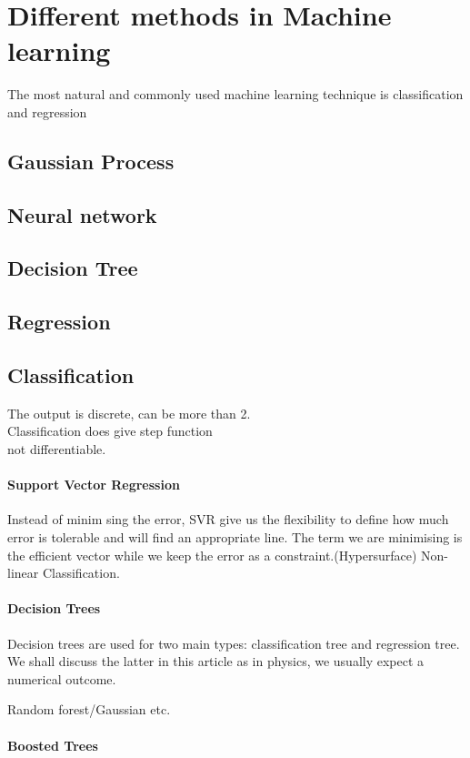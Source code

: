 \documentclass[12pt,a4paper]{article}
\begin{document}
\section{Different methods in Machine learning}
The most natural and commonly used machine learning technique is classification and regression
\subsection{Gaussian Process}
\subsection{Neural network}
\subsection{Decision Tree}
\subsection{Regression}
\subsection{Classification}
The output is discrete, can be more than 2.\\
Classification does give step function\\ not differentiable. 
\paragraph{Support Vector Regression}
Instead of minim sing the error, SVR give us the flexibility to define how much error is tolerable and will find an appropriate line. The term we are minimising is the efficient vector while we keep the error as a constraint.(Hypersurface)
Non-linear Classification.
\paragraph{Decision Trees}

Decision trees are used for two main types: classification tree and regression tree. We shall discuss the latter in this article as in physics, we usually expect a numerical outcome.

Random forest/Gaussian etc.
\paragraph{Boosted Trees}
\end{document}
